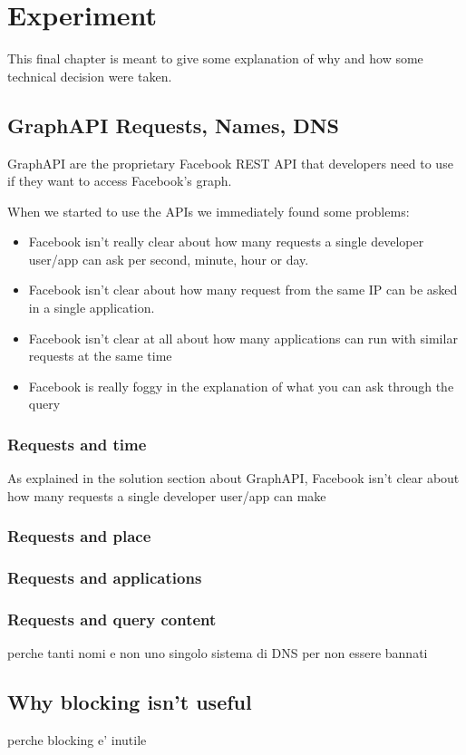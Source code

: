 \chapter{Experiment} 
This final chapter is meant to give some explanation of why and how some technical decision were taken.

\section{GraphAPI Requests, Names, DNS}
GraphAPI are the proprietary Facebook REST API that developers need to use if they want to access Facebook's graph. 

When we started to use the APIs we immediately found some problems:

\begin{itemize}
\item Facebook isn't really clear about how many requests a single developer user/app can ask per second, minute, hour or day.
\item Facebook isn't clear about how many request from the same IP can be asked in a single application.
\item Facebook isn't clear at all about how many applications can run with similar requests at the same time
\item Facebook is really foggy in the explanation of what you can ask through the query
\end{itemize}

\subsection*{Requests and time}
As explained in the solution section about GraphAPI, Facebook isn't clear about how many requests a single developer user/app can make
\subsection*{Requests and place}
\subsection*{Requests and applications}
\subsection*{Requests and query content}


perche tanti nomi e non uno singolo
sistema di DNS per non essere bannati

\section{Why blocking isn't useful}
perche blocking e' inutile
